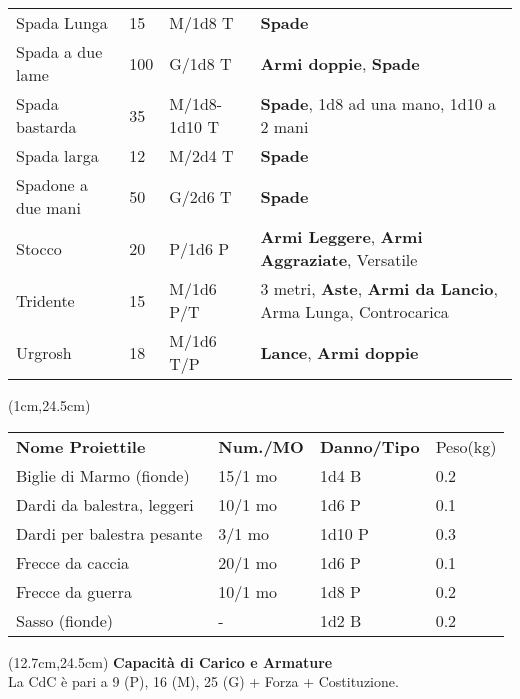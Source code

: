 \documentclass[a4paper,12 pt,openany]{book}
\begin{document}
\begin{textblock*}{19.5cm}
\begin{tabularx}{0.95\textwidth}{llll}
Spada Lunga& 15 & M/1d8 T&\textbf{Spade}\\
Spada a due lame& 100& G/1d8 T& \textbf{Armi doppie}, \textbf{Spade}\\
Spada bastarda& 35 & M/1d8-1d10 T&\textbf{Spade}, 1d8 ad una mano, 1d10 a 2 mani\\
Spada larga& 12 & M/2d4 T&\textbf{Spade}\\
Spadone a due mani& 50 & G/2d6 T&\textbf{Spade}\\
Stocco& 20 & P/1d6 P& \textbf{Armi Leggere}, \textbf{Armi Aggraziate}, Versatile\\
Tridente& 15 & M/1d6 P/T& 3 metri, \textbf{Aste}, \textbf{Armi da Lancio}, Arma Lunga, Controcarica\\
Urgrosh& 18 & M/1d6 T/P& \textbf{Lance}, \textbf{Armi doppie}\\
\end{tabularx}

\end{textblock*}

\begin{textblock*}{11.5cm}(1cm,24.5cm) %

\begin{tabular}{llll}
\textbf{Nome Proiettile}   & \textbf{Num./MO} & \textbf{Danno/Tipo} & Peso(kg) \\
Biglie di Marmo (fionde)   & 15/1 mo                    & 1d4 B               & 0.2      \\
Dardi da balestra, leggeri & 10/1 mo                    & 1d6 P               & 0.1      \\
Dardi per balestra pesante & 3/1 mo                     & 1d10 P              & 0.3      \\
Frecce da caccia           & 20/1 mo                    & 1d6 P               & 0.1      \\
Frecce da guerra           & 10/1 mo                    & 1d8 P               & 0.2      \\
Sasso (fionde)             & -                          & 1d2 B               & 0.2      \\
\end{tabular}

\end{textblock*}

\begin{textblock*}{7.8cm}(12.7cm,24.5cm) %
\textbf{Capacità di Carico e Armature}\\
La CdC è pari a 9 (P), 16 (M), 25 (G) + Forza + Costituzione.
\end{textblock*}
\end{document}
